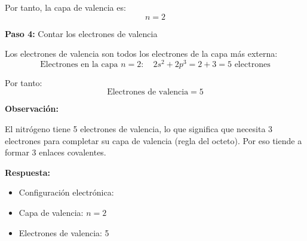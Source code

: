 \begin{exercise}
\begin{solu}
        Por tanto, la capa de valencia es:
        \[
            \boxed{n = 2}
        \]

        \textbf{Paso 4:} Contar los electrones de valencia

        Los electrones de valencia son todos los electrones de la capa más externa:
        \[
            \text{Electrones en la capa } n = 2: \quad 2s^2 + 2p^3 = 2 + 3 = 5 \text{ electrones}
        \]

        Por tanto:
        \[
            \boxed{\text{Electrones de valencia} = 5}
        \]

        \textbf{Observación:}

        El nitrógeno tiene 5 electrones de valencia, lo que significa que necesita 3 electrones para completar su capa de valencia (regla del octeto). Por eso tiende a formar 3 enlaces covalentes.

        \textbf{Respuesta:}
        \begin{itemize}
            \item Configuración electrónica: 
            \item Capa de valencia: \(n = 2\)
            \item Electrones de valencia: 5
        \end{itemize}
    \end{solu}
\end{exercise}

